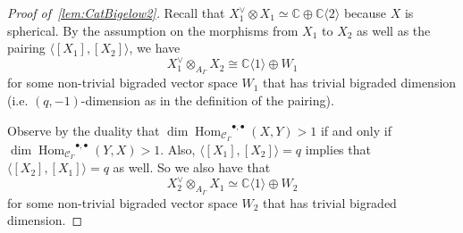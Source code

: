 \documentclass[a4paper]{amsart}
\newcommand{\C}{\mathbb{C}}
\newcommand{\0}{\mathbf{0}}
\DeclareMathOperator{\Hom}{Hom}
\newcommand{\HOM}{\ensuremath{\Hom_{\mathcal{C}_\Gamma}}}
\theoremstyle{theorem}
\begin{document}
\begin{proof}[Proof of~\cref{lem:CatBigelow2}]
  Recall that $X_1^\vee \otimes X_1\simeq \C\oplus \C\langle 2\rangle$ because \(X\) is spherical.
  By the assumption on the morphisms from \(X_1\) to \(X_2\) as well as the pairing \(\langle [X_1],[X_2] \rangle\), we have
  \[X_1^{\vee} \otimes_{A_{\Gamma}}X_2 \cong \mathbb{C}\langle 1 \rangle \oplus W_1\]
  for some non-trivial bigraded vector space $W_1$ that has trivial bigraded dimension (i.e. \((q,-1)\)-dimension as in the definition of the pairing).

  Observe by the duality that \(\dim\HOM^{\bullet,\bullet}(X,Y) > 1\) if and only if \(\dim\HOM^{\bullet,\bullet}(Y,X) > 1\).
  Also, \(\langle [X_1], [X_2] \rangle = q\) implies that \(\langle [X_2], [X_1] \rangle = q\) as well.
  So we also have that
  \[ X_2^\vee\otimes_{A_{\Gamma}} X_1\simeq \C\langle 1\rangle \oplus W_2\]
  for some non-trivial bigraded vector space $W_2$ that has trivial bigraded dimension.


\end{proof}
\end{document}
